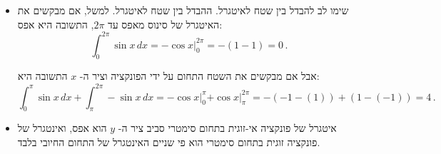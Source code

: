 \begin{itemize}
\item 
שימו לב להבדל בין שטח לאיטגרל. ההבדל בין שטח לאיטגרל. למשל, אם מבקשים את האיטגרל של סינוס מאפס עד 
$2\pi$,
התשובה היא אפס:
\[
\int_0^{2\pi} \sin x\, dx =-\left.\cos x\right|_0^{2\pi}= -(1-1)=0\,.
\]

\vspace{-4ex}

אבל אם מבקשים את השטח התחום על ידי הפונקציה וציר ה-%
$x$
התשובה היא:
\[
\int_0^{\pi} \sin x\, dx + \int_{\pi}^{2\pi} -\sin x\, dx = -\left.\cos x\right|_0^{\pi} \left.+\cos x\right|_{\pi}^{2\pi}= -(-1-(1))+(1-(-1))=4\,.
\]

\np

\begin{center}
\end{center}

\item
איטגרל של פונקציה אי-זוגית בתחום סימטרי סביב ציר ה-%
$y$
הוא אפס, ואינטגרל של פונקציה זוגית בתחום סימטרי הוא פי שניים האינטגרל של התחום החיובי בלבד.



\end{itemize}


